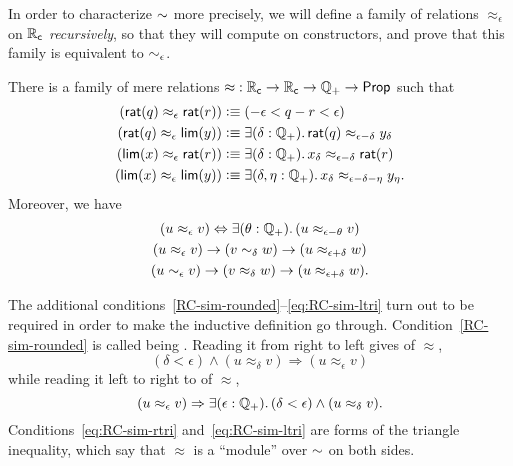 In order to characterize $\mathord\sim$ more precisely, we will define a family of relations $\approx_\epsilon$ on $\mathbb{R}_\mathsf{c}$ \emph{recursively}, so that they will compute on constructors, and prove that this family is equivalent to $\sim_{\epsilon}$.

\begin{thm}\label{defn:RC-approx}
  There is a family of mere relations $\mathord\approx:\mathbb{R}_\mathsf{c}\to\mathbb{R}_\mathsf{c}\to\mathbb{Q}_{+}\to\mathsf{Prop}$ such that
  \begin{align}
    (\rcrat(q) \approx_\epsilon \rcrat(r))  &\defeq
    (-\epsilon < q - r < \epsilon)\label{eq:RCappx1}\\
    (\rcrat(q) \approx_\epsilon \rclim(y)) &\defeq
    \exis{\delta : \Qp} \rcrat(q) \approx_{\epsilon - \delta} y_\delta\label{eq:RCappx2}\\
    (\rclim(x) \approx_\epsilon \rcrat(r)) &\defeq
    \exis{\delta : \Qp} x_\delta \approx_{\epsilon - \delta} \rcrat(r)\label{eq:RCappx3}\\
    (\rclim(x) \approx_\epsilon \rclim(y)) &\defeq
    \exis{\delta, \eta : \Qp} x_\delta \approx_{\epsilon - \delta - \eta} y_\eta.\label{eq:RCappx4}
  \end{align}
  Moreover, we have
  \begin{gather}
    (u \approx_\epsilon v) \Leftrightarrow \exis{\theta:\Qp} (u \approx_{\epsilon-\theta} v) \label{RC-sim-rounded}\\
    (u \approx_\epsilon v) \to (v\close\delta w) \to (u\approx_{\epsilon+\delta} w)\label{eq:RC-sim-rtri}\\ 
    (u \close\epsilon v) \to (v\approx_\delta w) \to (u\approx_{\epsilon+\delta} w)\label{eq:RC-sim-ltri}.
  \end{gather}
\end{thm}

The additional conditions~\eqref{RC-sim-rounded}--\eqref{eq:RC-sim-ltri} turn out to be required in order to make the inductive definition go through.
Condition~\eqref{RC-sim-rounded} is called being .
%
%
Reading it from right to left gives  of $\approx$,
%
%
%
\begin{equation*}
  (\delta < \epsilon) \land (u \approx_\delta v) \Rightarrow (u \approx_\epsilon v)
\end{equation*}
%
while reading it left to right to  of $\approx$,
%
%
%
\begin{equation*}
  (u \approx_\epsilon v) \Rightarrow \exis{\epsilon : \Qp} (\delta < \epsilon) \land (u \approx_\delta v).
\end{equation*}
%
Conditions~\eqref{eq:RC-sim-rtri} and~\eqref{eq:RC-sim-ltri} are forms of the triangle inequality, which say that $\approx$ is a ``module'' over $\mathord\sim$ on both sides.

